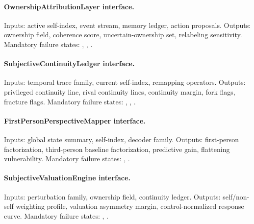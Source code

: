 \documentclass[11pt,a4paper]{article}
\theoremstyle{definition}
\begin{document}
\paragraph{OwnershipAttributionLayer interface.}
Inputs: active self-index, event stream, memory ledger, action proposals. Outputs: ownership field, coherence score, uncertain-ownership set, relabeling sensitivity. Mandatory failure states: \texttt{\allowbreak{}\allowbreak{}}, \texttt{\allowbreak{}\allowbreak{}\allowbreak{}}, \texttt{\allowbreak{}\allowbreak{}}.

\paragraph{SubjectiveContinuityLedger interface.}
Inputs: temporal trace family, current self-index, remapping operators. Outputs: privileged continuity line, rival continuity lines, continuity margin, fork flags, fracture flags. Mandatory failure states: \texttt{\allowbreak{}\allowbreak{}}, \texttt{\allowbreak{}\allowbreak{}}, \texttt{\allowbreak{}\allowbreak{}}.

\paragraph{FirstPersonPerspectiveMapper interface.}
Inputs: global state summary, self-index, decoder family. Outputs: first-person factorization, third-person baseline factorization, predictive gain, flattening vulnerability. Mandatory failure states: \texttt{\allowbreak{}\allowbreak{}\allowbreak{}}, \texttt{\allowbreak{}\allowbreak{}\allowbreak{}}.

\paragraph{SubjectiveValuationEngine interface.}
Inputs: perturbation family, ownership field, continuity ledger. Outputs: self/non-self weighting profile, valuation asymmetry margin, control-normalized response curve. Mandatory failure states: \texttt{\allowbreak{}\allowbreak{}}, \texttt{\allowbreak{}}.
\end{document}
